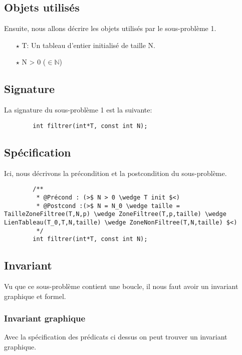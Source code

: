 \documentclass[a4paper, 11pt, oneside]{article}
\begin{document}
    \subsection{Objets utilisés}
        Ensuite, nous allons décrire les objets utilisés par le sous-problème 1.
            \begin{itemize}
                \item[$\star$] T: Un tableau d'entier initialisé de taille N.
                \item[$\star$] N > 0 ($\in \mathbb{N}$)
            \end{itemize}

    \subsection{Signature}
        La signature du sous-problème 1 est la suivante:
        \begin{lstlisting}
        int filtrer(int*T, const int N);
        \end{lstlisting}
        
    \subsection{Spécification}
        Ici, nous décrivons la précondition et la postcondition du sous-problème.
        \begin{lstlisting}
        /**
         * @Précond : (>$ N > 0 \wedge T init $<)
         * @Postcond :(>$ N = N_0 \wedge taille = TailleZoneFiltree(T,N,p) \wedge ZoneFiltree(T,p,taille) \wedge LienTableau(T_0,T,N,taille) \wedge ZoneNonFiltree(T,N,taille) $<)
         */
        int filtrer(int*T, const int N);
        \end{lstlisting}

    \subsection{Invariant}
        Vu que ce sous-problème contient une boucle, il nous faut avoir un invariant graphique et formel.
        \subsubsection{Invariant graphique}

        Avec la spécification des prédicats ci dessus on peut trouver un invariant graphique.
        
\end{document}
